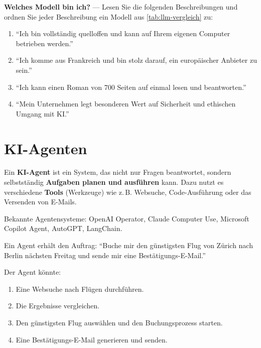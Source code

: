 \begin{myexercise}
\textbf{Welches Modell bin ich?} --- Lesen Sie die folgenden Beschreibungen und
ordnen Sie jeder Beschreibung ein Modell aus \cref{tab:llm-vergleich} zu:

\begin{enumerate}
    \item \enquote{Ich bin vollständig quelloffen und kann auf Ihrem eigenen
          Computer betrieben werden.}
    \item \enquote{Ich komme aus Frankreich und bin stolz darauf, ein europäischer
          Anbieter zu sein.}
    \item \enquote{Ich kann einen Roman von 700 Seiten auf einmal lesen und
          beantworten.}
    \item \enquote{Mein Unternehmen legt besonderen Wert auf Sicherheit und
          ethischen Umgang mit KI.}
\end{enumerate}
\end{myexercise}

\section{KI-Agenten}

\begin{mydefinition}
Ein \textbf{KI-Agent} ist ein System, das nicht nur Fragen beantwortet, sondern
selbstständig \textbf{Aufgaben planen und ausführen} kann. Dazu nutzt es
verschiedene \textbf{Tools} (Werkzeuge) wie z.\,B. Websuche, Code-Ausführung
oder das Versenden von E-Mails.

Bekannte Agentensysteme: OpenAI Operator, Claude Computer Use,
Microsoft Copilot Agent, AutoGPT, LangChain.
\end{mydefinition}

\begin{myexample}
Ein Agent erhält den Auftrag: \enquote{Buche mir den günstigsten Flug von Zürich
nach Berlin nächsten Freitag und sende mir eine Bestätigungs-E-Mail.}

Der Agent könnte:
\begin{enumerate}
    \item Eine Websuche nach Flügen durchführen.
    \item Die Ergebnisse vergleichen.
    \item Den günstigsten Flug auswählen und den Buchungsprozess starten.
    \item Eine Bestätigungs-E-Mail generieren und senden.
\end{enumerate}
\end{myexample}

